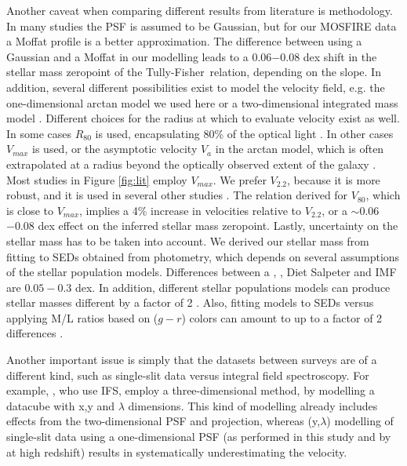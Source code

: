 \documentclass{emulateapj}
\newcommand{\tf}{Tully-Fisher}
\begin{document}
{Another caveat when comparing different results from literature is methodology. In many studies the PSF is assumed to be Gaussian, but for our MOSFIRE data a Moffat profile is a better approximation. The difference between using a Gaussian and a Moffat in our modelling leads to a 0.06{$-0.08$} dex shift in the stellar mass zeropoint of the \tf\ relation{, depending on the slope}. 
In addition, several different possibilities exist to model the velocity field, e.g. the one-dimensional arctan model we used here \citep[and also used by e.g.][]{Miller11,Miller12} or a two-dimensional integrated mass model \citep{Cresci09,Gnerucci11}. Different choices for the radius at which to evaluate velocity exist as well. In some cases $R_{80}$ is used, encapsulating 80\% of the optical light \citep{Reyes11}. In other cases $V_{max}$ is used, or the asymptotic velocity $V_{a}$ in the arctan model, which is often extrapolated at a radius beyond the optically observed extent of the galaxy \citep[e.g.][]{Weiner06b}. Most studies in Figure {\ref{fig:lit}} employ $V_{max}$. We prefer $V_{2.2}$, because it is more robust, and it is used in several other studies \citep[e.g.][]{Miller11,Miller12}. The relation \citet{Reyes11} derived for $V_{80}$, which is close to $V_{max}$, implies a 4\% increase in velocities relative to $V_{2.2}$, or a $\sim0.06${$-0.08$} dex effect on the inferred stellar mass zeropoint. Lastly, uncertainty on the stellar mass has to be taken into account. We derived our stellar mass from fitting to SEDs obtained from photometry, which depends on several assumptions of the stellar population models. Differences between a \citet{Salpeter55}, \citet{Kroupa01}, Diet Salpeter \citep{Bell03} and \citet{Chabrier03} IMF are $0.05-0.3$ dex. In addition, different stellar populations models can produce stellar masses different by a factor of 2 \citep[e.g. the review of][]{Conroy13}. Also, fitting models to SEDs versus applying M/L ratios based on ($g-r$) colors \citep{Bell03,Puech08} can amount to up to a factor of 2 differences \citep{Reyes11}. 

Another important issue is simply that the datasets between surveys are of a different kind, such as single-slit data versus integral field spectroscopy. For example, \citet{Cresci09}, who use IFS, employ a three-dimensional method, by modelling a datacube with x,y and $\lambda$ dimensions. This kind of modelling already includes effects from the two-dimensional PSF and projection, whereas (y,$\lambda$) modelling of single-slit data using a one-dimensional PSF (as performed in this study and by \citet{Conselice05,Kassin07,Miller11,Miller12} at high redshift) results in systematically underestimating the velocity. 

}
\end{document}
